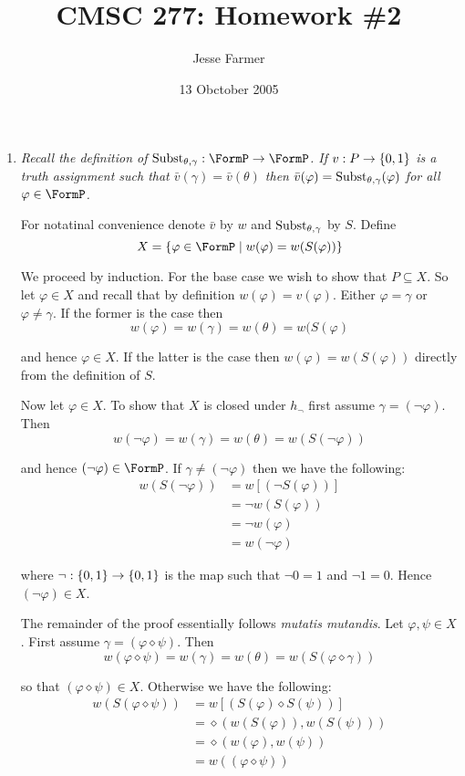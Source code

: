 \documentclass[10pt]{article}
\title{CMSC 277: Homework \#2}
\author{Jesse Farmer}
\date{13 Obctober 2005}
\begin{document}
\maketitle

\begin{enumerate}
\item \emph{Recall the definition of $\Subst_{\theta, \gamma} : \FormP \to \FormP$.  If $v: P \to \left\{ 0,1 \right\}$ is a truth assignment such that $\bar{v}(\gamma) = \bar{v}(\theta)$ then $\bar{v}(\varphi) = \operatorname{Subst}_{\theta, \gamma}(\varphi)$ for all $\varphi \in \FormP$. }

For notatinal convenience denote $\bar{v}$ by $w$ and $\operatorname{Subst}_{\theta, \gamma}$ by $S$.  Define
\[
X = \set{\varphi \in \FormP \mid w(\varphi) = w(S(\varphi))}
\]

We proceed by induction.  For the base case we wish to show that $P \subseteq X$.  So let $\varphi \in X$ and recall that by definition $w(\varphi) = v(\varphi)$.  Either $\varphi = \gamma$ or $\varphi \neq \gamma$.  If the former is the case then
\[
w(\varphi) = w(\gamma) = w(\theta) = w(S(\varphi)
\]

and hence $\varphi \in X$.  If the latter is the case then $w(\varphi) = w(S(\varphi))$ directly from the definition of $S$.

Now let $\varphi \in X$.  To show that $X$ is closed under $h_{\neg}$ first assume $\gamma = (\neg \varphi)$.  Then
\[
w(\neg \varphi) = w(\gamma) = w(\theta) = w(S(\neg \varphi))
\]

and hence $(\neg \varphi) \in \FormP$.  If $\gamma \neq (\neg \varphi)$ then we have the following:
\begin{align*}
w(S(\neg \varphi)) &= w[(\neg S(\varphi))] \\
&= \neg w(S(\varphi)) \\
&= \neg w(\varphi) \\
&= w(\neg \varphi)
\end{align*}

where $\neg: \left\{ 0,1 \right\} \to \left\{ 0,1 \right\}$ is the map such that $\neg 0 = 1$ and $\neg 1 = 0$.  Hence $(\neg \varphi) \in X$.

The remainder of the proof essentially follows \emph{mutatis mutandis}.  Let $\varphi, \psi \in X$.  First assume $\gamma = (\varphi \diamond \psi)$.  Then
\[
w(\varphi \diamond \psi) = w(\gamma) = w(\theta) = w(S(\varphi \diamond \gamma))
\]

so that $(\varphi \diamond \psi) \in X$.  Otherwise we have the following:
\begin{align*}
w(S(\varphi \diamond \psi)) &= w[(S(\varphi) \diamond S(\psi))] \\
&= \diamond (w(S(\varphi)), w(S(\psi))) \\
&= \diamond (w(\varphi), w(\psi)) \\
&= w((\varphi \diamond \psi))
\end{align*}


\end{enumerate}
\end{document}
